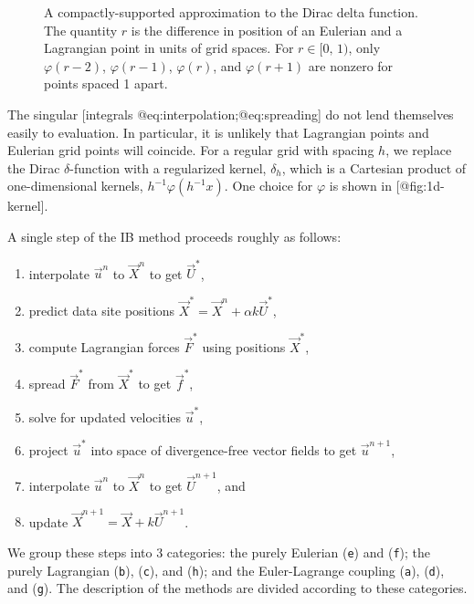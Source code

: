 \begin{figure}[thb]
    \centering
    \caption{%
        A compactly-supported approximation to the Dirac delta function. The
        quantity $r$ is the difference in position of an Eulerian and
        a Lagrangian point in units of grid spaces. For $r\in[0,\,1)$, only
        $\varphi(r-2)$, $\varphi(r-1)$, $\varphi(r)$, and $\varphi(r+1)$ are
        nonzero for points spaced 1 apart.
    }
    \label{fig:1d-kernel}
\end{figure}

The singular [integrals @eq:interpolation;@eq:spreading] do not lend themselves
easily to evaluation. In particular, it is unlikely that Lagrangian points and
Eulerian grid points will coincide. For a regular grid with spacing $h$, we
replace the Dirac $\delta$-function with a regularized kernel, $\delta_h$,
which is a Cartesian product of one-dimensional kernels,
$h^{-1}\varphi(h^{-1}x)$. One choice for $\varphi$ is shown in [@fig:1d-kernel]. 

A single step of the IB method proceeds roughly as follows:
\begin{enumerate}[label=(\texttt{\alph*})]
    \item interpolate $\vec{u}^n$ to $\vec{X}^n$ to get $\vec{U}^\ast$,
    \item predict data site positions $\vec{X}^\ast = \vec{X}^n + \alpha k\vec{U}^\ast$,
    \item compute Lagrangian forces $\vec{F}^\ast$ using positions $\vec{X}^\ast$,
    \item spread $\vec{F}^\ast$ from $\vec{X}^\ast$ to get $\vec{f}^\ast$,
    \item solve for updated velocities $\vec{u}^\ast$,
    \item project $\vec{u}^\ast$ into space of divergence-free vector fields to
        get $\vec{u}^{n+1}$,
    \item interpolate $\vec{u}^{n}$ to $\vec{X}^{n}$ to get $\vec{U}^{n+1}$, and
    \item update $\vec{X}^{n+1} = \vec{X} + k \vec{U}^{n+1}$.
\end{enumerate}
We group these steps into 3 categories: the purely Eulerian
(\texttt{e}) and (\texttt{f}); the purely Lagrangian (\texttt{b}), (\texttt{c}),
and (\texttt{h}); and the Euler-Lagrange coupling (\texttt{a}), (\texttt{d}),
and (\texttt{g}). The description of the methods are divided according to these
categories.
